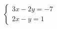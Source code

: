 $\displaystyle
\left\{
\begin{array}{l}
\displaystyle 3x - 2y = -7 \\
\displaystyle 2x - y = 1
\end{array}
\right.
$
